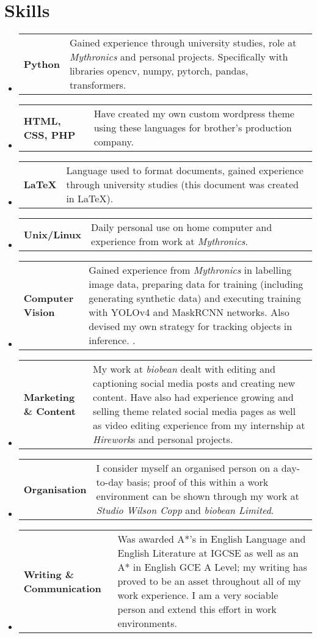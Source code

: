\documentclass[a4paper,11pt]{article}
\makeatletter
\newcommand{\resumeSkill}[2]{
    \vspace{0.5mm}\item
    \begin{tabular*}{0.98\textwidth}[t]{l@{\extracolsep{\fill}}p{0.7\textwidth}}
        \textbf{#1} & #2 \\
    \end{tabular*}
    \vspace{-2.4mm}
}
\newcommand{\resumeSubHeadingListStart}{\begin{itemize}[leftmargin=*,labelsep=0mm]}
\newcommand{\resumeSubHeadingListEnd}{\end{itemize}\vspace{2mm}}
\makeatother
\begin{document}
\section{\textbf{Skills}}
\resumeSubHeadingListStart
    \resumeSkill{Python}{Gained experience through university studies, role at \textit{Mythronics} and personal projects. Specifically with libraries opencv, numpy, pytorch, pandas, transformers.}
    \resumeSkill{HTML, CSS, PHP}{Have created my own custom wordpress theme using these languages for brother's production company.}
    \resumeSkill{LaTeX}{Language used to format documents, gained experience through university studies (this document was created in LaTeX).}
    \resumeSkill{Unix/Linux}{Daily personal use on home computer and experience from work at \textit{Mythronics}.}
    \resumeSkill{Computer Vision}{Gained experience from \textit{Mythronics} in labelling image data, preparing data for training (including generating synthetic data) and executing training with YOLOv4 and MaskRCNN networks. Also
    devised my own strategy for tracking objects in
    inference. .}
    \resumeSkill{Marketing \& Content}{My work at \textit{biobean} dealt with editing and captioning social media posts and creating new content. Have also had experience growing and selling theme related social media pages as well as video editing experience from my internship at \textit{Hirework}s and personal projects.}
    \resumeSkill{Organisation}{I consider myself an organised person on a day-to-day basis; proof of this within a work environment can be shown through my work at \textit{Studio Wilson Copp} and \textit{biobean Limited}.}
    \resumeSkill{Writing \& Communication}{Was awarded A*’s in English Language and English Literature at IGCSE as well as an A* in English GCE A Level; my writing has proved to be an asset throughout all of my work experience. I am a very sociable person and extend this effort in work environments. }
\resumeSubHeadingListEnd
\vspace{-8.5mm}




\end{document}
